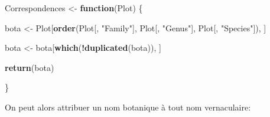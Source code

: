 \documentclass[
  11pt,
  french,
  A4paper,
  extrafontsizes,onecolumn,openright
  ]{memoir}
\newenvironment{Shaded}{\begin{snugshade}}{\end{snugshade}}
\newcommand{\KeywordTok}[1]{\textcolor[rgb]{0.13,0.29,0.53}{\textbf{#1}}}
\newcommand{\StringTok}[1]{\textcolor[rgb]{0.31,0.60,0.02}{#1}}
\newcommand{\ControlFlowTok}[1]{\textcolor[rgb]{0.13,0.29,0.53}{\textbf{#1}}}
\newcommand{\OperatorTok}[1]{\textcolor[rgb]{0.81,0.36,0.00}{\textbf{#1}}}
\newcommand{\NormalTok}[1]{#1}
\begin{document}
\begin{Shaded}
\begin{Highlighting}[]
\NormalTok{Correspondences <-}\StringTok{ }\ControlFlowTok{function}\NormalTok{(Plot) \{}
    
\NormalTok{    bota <-}\StringTok{ }\NormalTok{Plot[}\KeywordTok{order}\NormalTok{(Plot[, }\StringTok{"Family"}\NormalTok{], Plot[, }\StringTok{"Genus"}\NormalTok{], Plot[, }\StringTok{"Species"}\NormalTok{]), }
\NormalTok{        ]}
    
\NormalTok{    bota <-}\StringTok{ }\NormalTok{bota[}\KeywordTok{which}\NormalTok{(}\OperatorTok{!}\KeywordTok{duplicated}\NormalTok{(bota)), ]}
    
    \KeywordTok{return}\NormalTok{(bota)}
    
\NormalTok{\}}
\end{Highlighting}
\end{Shaded}

On peut alors attribuer un nom botanique à tout nom vernaculaire:
\end{document}
